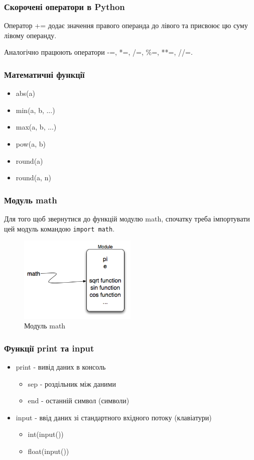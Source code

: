 \begin{frame}
\frametitle{Скорочені оператори в Python}
Оператор += додає значення правого операнда до лівого та присвоює цю суму лівому операнду.

Аналогічно працюють оператори -=, *=, /=, \%=, **=, //=.  
\end{frame}


\begin{frame}
\frametitle{Математичні функції}
\begin{itemize}
  \item abs(a)
  \item min(a, b, ...)
  \item max(a, b, ...)
  \item pow(a, b)
  \item round(a)
  \item round(a, n)
\end{itemize} 
  
\end{frame}

\begin{frame}
\frametitle{Модуль math}
Для того щоб звернутися до функцій модулю math, спочатку треба імпортувати цей модуль командою \texttt{import math}.
\begin{figure}
\begin{center}
 \includegraphics[width=0.5\textwidth]{pictures/mathmod.png}
\caption{Модуль math}
\label{mathmodule} 
\end{center}
\end{figure}
\end{frame}

\begin{frame}
\frametitle{Функції print та input}
\begin{itemize}
  \item print - вивід даних в консоль
      \begin{itemize}
        \item sep - роздільник між даними
        \item end - останній символ (символи)
     \end{itemize} 
  \item input - ввід даних зі стандартного вхідного потоку (клавіатури)
      \begin{itemize}
        \item int(input())
        \item float(input())
     \end{itemize}
 \end{itemize} 
\end{frame}
